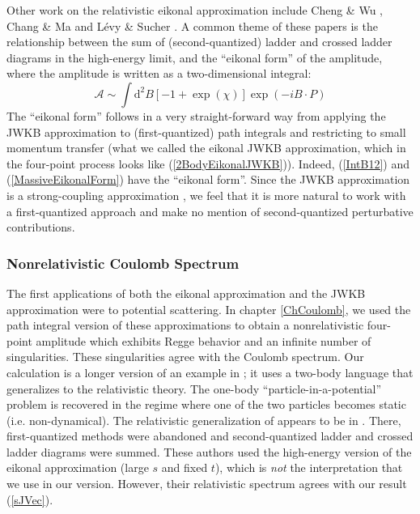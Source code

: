 Other work on the relativistic eikonal approximation include Cheng \& Wu \cite{ChengWuPRL,ChengWuPR1,ChengWuPR2,ChengWuPR3,ChengWuPR4}, Chang \& Ma \cite{ChangMa} and L\'{e}vy \& Sucher \cite{LevySucher1}. A common theme of these papers is the relationship between the sum of (second-quantized) ladder and crossed ladder diagrams in the high-energy limit, and the ``eikonal form'' of the amplitude, where the amplitude is written as a two-dimensional integral:
\begin{equation}
	\mathcal{A} \sim \int \mathrm{d}^{2}B \left[ -1 + \exp{(\chi)} \right] \exp{(-i B \cdot P)}
\end{equation}
The ``eikonal form'' follows in a very straight-forward way from applying the JWKB approximation to (first-quantized) path integrals and restricting to small momentum transfer (what we called the eikonal JWKB approximation, which in the four-point process looks like (\ref{2BodyEikonalJWKB})). Indeed, (\ref{IntB12}) and (\ref{MassiveEikonalForm}) have the ``eikonal form''. Since the JWKB approximation is a strong-coupling approximation \cite{HalpernSiegel}, we feel that it is more natural to work with a first-quantized approach and make no mention of second-quantized perturbative contributions.
\subsubsection{Nonrelativistic Coulomb Spectrum}
The first applications of both the eikonal approximation and the JWKB approximation were to potential scattering. In chapter \ref{ChCoulomb}, we used the path integral version of these approximations to obtain a nonrelativistic four-point amplitude which exhibits Regge behavior and an infinite number of singularities. These singularities agree with the Coulomb spectrum. Our calculation is a longer version of an example in \cite{ZinnJustin}; it uses a two-body language that generalizes to the relativistic theory. The one-body ``particle-in-a-potential'' problem is recovered in the regime where one of the two particles becomes static (i.e. non-dynamical). The relativistic generalization of \cite{ZinnJustin} appears to be in \cite{BIZJ}. There, first-quantized methods were abandoned and second-quantized ladder and crossed ladder diagrams were summed. These authors used the high-energy version of the eikonal approximation (large $s$ and fixed $t$), which is \textit{not} the interpretation that we use in our version. However, their relativistic spectrum agrees with our result (\ref{sJVec}).
